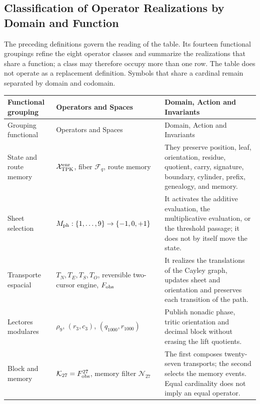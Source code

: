 \subsection{Classification of Operator Realizations by Domain and Function}

The preceding definitions govern the reading of the table. Its fourteen
functional groupings refine the eight operator classes and summarize the
realizations that share a function; a class may therefore occupy more
than one row. The table does not operate as a replacement definition. Symbols that
share a cardinal remain separated by domain and codomain.

\begingroup
\footnotesize
\renewcommand{\arraystretch}{1.06}
\begin{longtable}{@{}p{}p{}p{}@{}}
\toprule
Functional grouping & Operators and Spaces & Domain, Action and Invariants \\
\midrule
\endfirsthead
\toprule
Grouping functional & Operators and Spaces & Domain, Action and Invariants \\
\midrule
\endhead
State and route memory &
\(\mathcal X_{\rm TPK}^{\rm enr}\), fiber \(\mathcal F_q\), route memory &
They preserve position, leaf, orientation, residue, quotient, carry, signature,
boundary, cylinder, prefix, genealogy, and memory. \\

Sheet selection &
\(M_{\rm ph}:\{1,\ldots,9\}\to\{-1,0,+1\}\) &
It activates the additive evaluation, the multiplicative evaluation, or the threshold passage; it does not
by itself move the state. \\

Transporte espacial &
\(T_N,T_E,T_S,T_O\), reversible two-cursor engine,
\(F_{\rm obs}\) &
It realizes the translations of the Cayley graph, updates sheet and orientation and
preserves each transition of the path. \\

Lectores modulares &
\(\rho_9\), \((r_3,c_3)\), \((q_{1000},r_{1000})\) &
Publish nonadic phase, tritic orientation and decimal block without erasing the lift quotients. \\

Block and memory &
\(\mathcal K_{27}=F_{\rm obs}^{27}\), memory filter
\(\mathcal N_{27}\) &
The first composes twenty-seven transports; the second selects the
memory events. Equal cardinality does not imply an equal operator. \\


\end{longtable}
